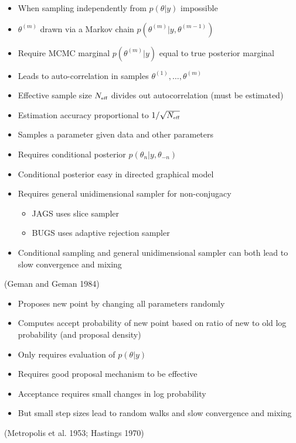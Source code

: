 \documentclass[10pt]{report}
\newcommand{\sld}[1]{\newpage{\noindent\LARGE \ \ \
    \textcolor{MidnightBlue}{\bfseries #1}}\vspace*{4pt}}
\begin{document}
\sld{Markov Chain Monte Carlo}
\begin{itemize}
\item When sampling independently from $p(\theta|y)$ impossible
\item $\theta^{(m)}$ drawn via a Markov chain $p(\theta^{(m)}|y,\theta^{(m-1)})$
\item Require MCMC marginal $p(\theta^{(m)}|y)$ equal to true
  posterior marginal
\item Leads to auto-correlation in samples
  $\theta^{(1)},\ldots, \theta^{(m)}$
\item Effective sample size $N_{\mbox{\tiny eff}}$ divides out
  autocorrelation (must be estimated)
\item Estimation accuracy proportional to $1 / \sqrt{N_{\mbox{\tiny eff}}}$
\end{itemize}

\sld{Gibbs Sampling}
\begin{itemize}
\item Samples a parameter given data and other parameters
\item Requires conditional posterior $p(\theta_n|y,\theta_{-n})$
\item Conditional posterior easy in directed graphical model
\item Requires general unidimensional sampler for non-conjugacy

\begin{itemize}
\item JAGS uses slice sampler
\item BUGS uses adaptive rejection sampler
\end{itemize}
\item Conditional sampling and general unidimensional sampler 
can both lead to slow convergence and mixing
\end{itemize}
\vfill\hfill
{\small (Geman and Geman 1984)}

\sld{Metropolis-Hastings Sampling}
\begin{itemize}
\item Proposes new point by changing all parameters randomly
\item Computes accept probability of new point based
on ratio of new to old log probability (and proposal density)
\item Only requires evaluation of $p(\theta|y)$
\item Requires good proposal mechanism to be effective
\item Acceptance requires small changes in log probability
\item But small step sizes lead to random walks and slow convergence
  and mixing
\end{itemize}
\vfill\hfill
{\small (Metropolis et al. 1953; Hastings 1970)}
\end{document}
